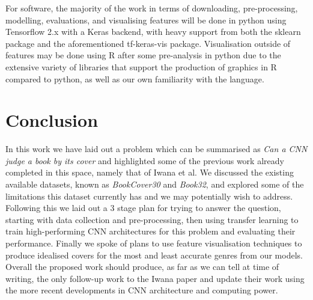 \documentclass[12pt]{article}
\numberwithin{equation}{section}
\numberwithin{figure}{section}
\begin{document}
For software, the majority of the work in terms of downloading, pre-processing, modelling, evaluations, and visualising features will be done in python using Tensorflow 2.x with a Keras backend, with heavy support from both the sklearn package and the aforementioned tf-keras-vis package. Visualisation outside of features may be done using R after some pre-analysis in python due to the extensive variety of libraries that support the production of graphics in R compared to python, as well as our own familiarity with the language.  
\section{Conclusion} %
\label{sec:conclusion}
In this work we have laid out a problem which can be summarised as \emph{Can a CNN judge a book by its cover} and highlighted some of the previous work already completed in this space, namely that of Iwana et al. We discussed the existing available datasets, known as \emph{BookCover30} and \emph{Book32}, and explored some of the limitations this dataset currently has and we may potentially wish to address. Following this we laid out a 3 stage plan for trying to answer the question, starting with data collection and pre-processing, then using transfer learning to train high-performing CNN architectures for this problem and evaluating their performance. Finally we spoke of plans to use feature visualisation techniques to produce idealised covers for the most and least accurate genres from our models. Overall the proposed work should produce, as far as we can tell at time of writing, the only follow-up work to the Iwana paper and update their work using the more recent developments in CNN architecture and computing power.

 
\end{document}

